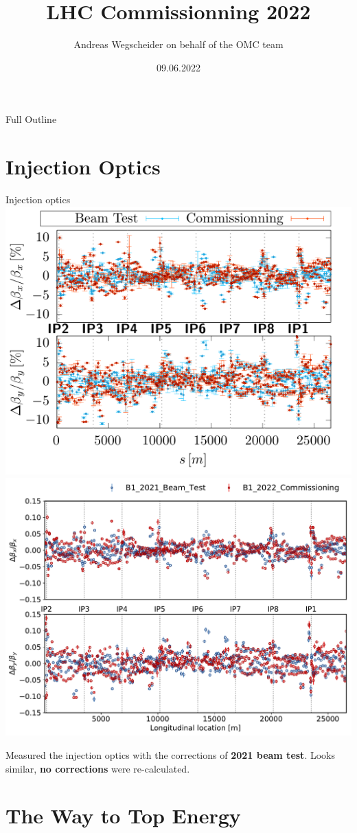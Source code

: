 \documentclass[11pt,usenames,dvipsnames,aspectration=169]{beamer}
\author[OMC]{Andreas Wegscheider on behalf of the OMC team}
\title[LHC 2022]{LHC Commissionning 2022}
\institute{CERN}
\date[09.06.22]{09.06.2022}
\newcommand{\highl}[1]{\textbf{#1}}
\begin{document}


\begin{frame}
    \titlepage
\end{frame}


\begin{frame}{Full Outline}
\tableofcontents
\end{frame}
\small

\section{Injection Optics}
\begin{frame}{Injection optics}
    \includegraphics[width=0.49\linewidth]{images/beamtest/b1_bb.pdf}
    \hfill
    \includegraphics[width=0.49\linewidth]{images/beamtest/lhcb1_betabeat_vs_beamtest.pdf}
    
    Measured the injection optics with the corrections of \highl{2021 beam test}.
    Looks similar, \highl{no corrections} were re-calculated.
\end{frame}

\section{The Way to Top Energy}
\end{document}
